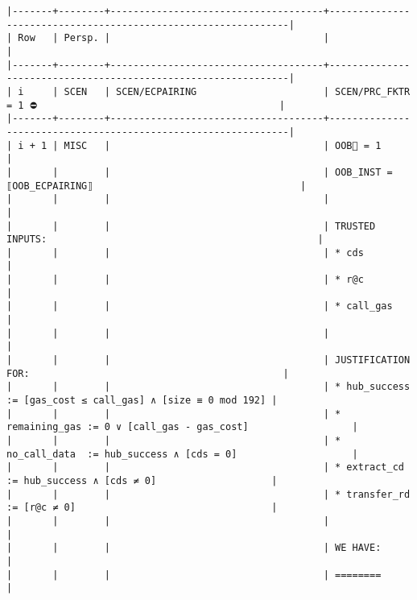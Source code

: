 \documentclass[varwidth=\maxdimen,margin=0.5cm,multi={verbatim}]{standalone}
\begin{document}
\begin{verbatim}
|-------+--------+-------------------------------------+---------------------------------------------------------------|
| Row   | Persp. |                                     |                                                               |
|-------+--------+-------------------------------------+---------------------------------------------------------------|
| i     | SCEN   | SCEN/ECPAIRING                      | SCEN/PRC_FKTR = 1 ⛔                                          |
|-------+--------+-------------------------------------+---------------------------------------------------------------|
| i + 1 | MISC   |                                     | OOB🚩 = 1                                                     |
|       |        |                                     | OOB_INST = ⟦OOB_ECPAIRING⟧                                    |
|       |        |                                     |                                                               |
|       |        |                                     | TRUSTED INPUTS:                                               |
|       |        |                                     | * cds                                                         |
|       |        |                                     | * r@c                                                         |
|       |        |                                     | * call_gas                                                    |
|       |        |                                     |                                                               |
|       |        |                                     | JUSTIFICATION FOR:                                            |
|       |        |                                     | * hub_success   := [gas_cost ≤ call_gas] ∧ [size ≡ 0 mod 192] |
|       |        |                                     | * remaining_gas := 0 ∨ [call_gas - gas_cost]                  |
|       |        |                                     | * no_call_data  := hub_success ∧ [cds = 0]                    |
|       |        |                                     | * extract_cd    := hub_success ∧ [cds ≠ 0]                    |
|       |        |                                     | * transfer_rd   := [r@c ≠ 0]                                  |
|       |        |                                     |                                                               |
|       |        |                                     | WE HAVE:                                                      |
|       |        |                                     | ========                                                      |

\end{verbatim}
\end{document}
